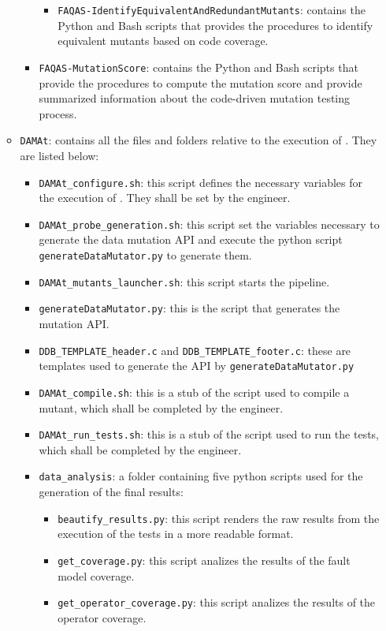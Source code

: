 \begin{itemize}
\begin{itemize}
\begin{itemize}
\begin{itemize}
				\item \texttt{FAQAS-IdentifyEquivalentAndRedundantMutants}: contains the Python and Bash scripts that provides the procedures to identify equivalent mutants based on code coverage.
			\end{itemize}
			\item \texttt{FAQAS-MutationScore}: contains the Python and Bash scripts that provide the procedures to compute the mutation score and provide summarized information about the code-driven mutation testing process.
		\end{itemize}
		\item \texttt{DAMAt}: contains all the files and folders relative to the execution of \DAMA. They are listed below:
		\begin{itemize}
			\item \texttt{DAMAt\_configure.sh}: this script defines the necessary variables for the execution of \DAMA. They shall be set by the engineer.
			\item \texttt{DAMAt\_probe\_generation.sh}: this script set the variables necessary to generate the data mutation API and execute the python script \texttt{generateDataMutator.py} to generate them.
			\item \texttt{DAMAt\_mutants\_launcher.sh}: this script starts the \DAMA pipeline.
			\item \texttt{generateDataMutator.py}: this is the script that generates the \DAMA mutation API.
			\item \texttt{DDB\_TEMPLATE\_header.c} and \texttt{DDB\_TEMPLATE\_footer.c}: these are templates used to generate the \DAMA API by \texttt{generateDataMutator.py}
			\item \texttt{DAMAt\_compile.sh}: this is a stub of the script used to compile a mutant, which shall be completed by the engineer.
			\item \texttt{DAMAt\_run\_tests.sh}: this is a stub of the script used to run the tests, which shall be completed by the engineer.
			\item \texttt{data\_analysis}: a folder containing five python scripts used for the generation of the final results:
			\begin{itemize}
				\item \texttt{beautify\_results.py}: this script renders the raw results from the execution of the tests in a more readable format.
				\item \texttt{get\_coverage.py}: this script analizes the results of the fault model coverage.
				\item \texttt{get\_operator\_coverage.py}: this script analizes the results of the operator coverage.

\end{itemize}
\end{itemize}
\end{itemize}
\end{itemize}
